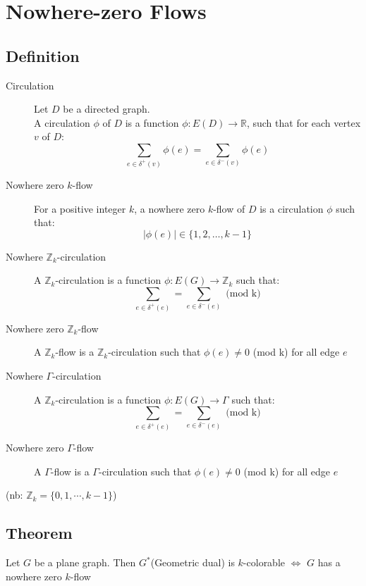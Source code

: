 \chapter{Nowhere-zero Flows}
    \section{Definition}
        \begin{description}
            \item[Circulation] Let $D$ be a directed graph.\\
                A circulation $\phi$ of $D$ is a function $\phi:E(D)\rightarrow \mathbb{R}$, such that for each vertex $v$ of $D$:
                \[
                    \sum_{e\in\delta^+(v)}\phi(e)=\sum_{e\in\delta^-(v)}\phi(e)
                \]
            \item[Nowhere zero $k$-flow] For a positive integer $k$, a nowhere zero $k$-flow of $D$ is a circulation $\phi$ such that:
                \[
                    |\phi(e)|\in \{1, 2, \ldots, k-1\}
                \]
            \item[Nowhere $\mathbb{Z}_k$-circulation] A $\mathbb{Z}_k$-circulation is a function $\phi:E(G)\rightarrow \mathbb{Z}_k$ such that:\\
                \[
                    \sum_{e\in\delta^+(e)}=\sum_{e\in\delta^-(e)}\text{ (mod k)}
                \]
            \item[Nowhere zero $\mathbb{Z}_k$-flow] A $\mathbb{Z}_k$-flow is a $\mathbb{Z}_k$-circulation such that $\phi(e)\neq0$ (mod k) for all edge $e$
            \item[Nowhere $\Gamma$-circulation] A $\mathbb{Z}_k$-circulation is a function $\phi:E(G)\rightarrow \Gamma$ such that:\\
                \[
                    \sum_{e\in\delta^+(e)}=\sum_{e\in\delta^-(e)}\text{ (mod k)}
                \]
            \item[Nowhere zero $\Gamma$-flow] A $\Gamma$-flow is a $\Gamma$-circulation such that $\phi(e)\neq0$ (mod k) for all edge $e$
        \end{description}
        (nb: $\mathbb{Z}_k = \{0, 1, \cdots, k-1\}$)
    \section{Theorem}
        Let $G$ be a plane graph. Then $G^*$(Geometric dual) is $k$-colorable $\Leftrightarrow$ $G$ has a nowhere zero $k$-flow\\
